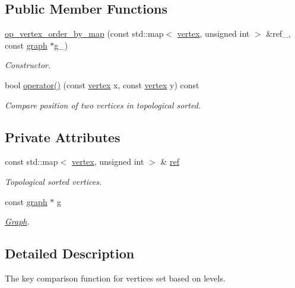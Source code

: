 \subsection*{Public Member Functions}
\begin{DoxyCompactItemize}
\item 
\hyperlink{classop__vertex__order__by__map_addb180a98b65dafe68efb76ca14f0de0}{op\+\_\+vertex\+\_\+order\+\_\+by\+\_\+map} (const std\+::map$<$ \hyperlink{graph_8hpp_abefdcf0544e601805af44eca032cca14}{vertex}, unsigned int $>$ \&ref\+\_\+, const \hyperlink{structgraph}{graph} $\ast$g\+\_\+)
\begin{DoxyCompactList}\small\item\em Constructor. \end{DoxyCompactList}\item 
bool \hyperlink{classop__vertex__order__by__map_a8147b8c9bd83ccb15e82507a650eaba1}{operator()} (const \hyperlink{graph_8hpp_abefdcf0544e601805af44eca032cca14}{vertex} x, const \hyperlink{graph_8hpp_abefdcf0544e601805af44eca032cca14}{vertex} y) const
\begin{DoxyCompactList}\small\item\em Compare position of two vertices in topological sorted. \end{DoxyCompactList}\end{DoxyCompactItemize}
\subsection*{Private Attributes}
\begin{DoxyCompactItemize}
\item 
const std\+::map$<$ \hyperlink{graph_8hpp_abefdcf0544e601805af44eca032cca14}{vertex}, unsigned int $>$ \& \hyperlink{classop__vertex__order__by__map_a843cf2fd586d00ce81ef4f65ded8f637}{ref}
\begin{DoxyCompactList}\small\item\em Topological sorted vertices. \end{DoxyCompactList}\item 
const \hyperlink{structgraph}{graph} $\ast$ \hyperlink{classop__vertex__order__by__map_a96d9ff362e3189fef4206975913f55d9}{g}
\begin{DoxyCompactList}\small\item\em \hyperlink{structGraph}{Graph}. \end{DoxyCompactList}\end{DoxyCompactItemize}


\subsection{Detailed Description}
The key comparison function for vertices set based on levels. 

